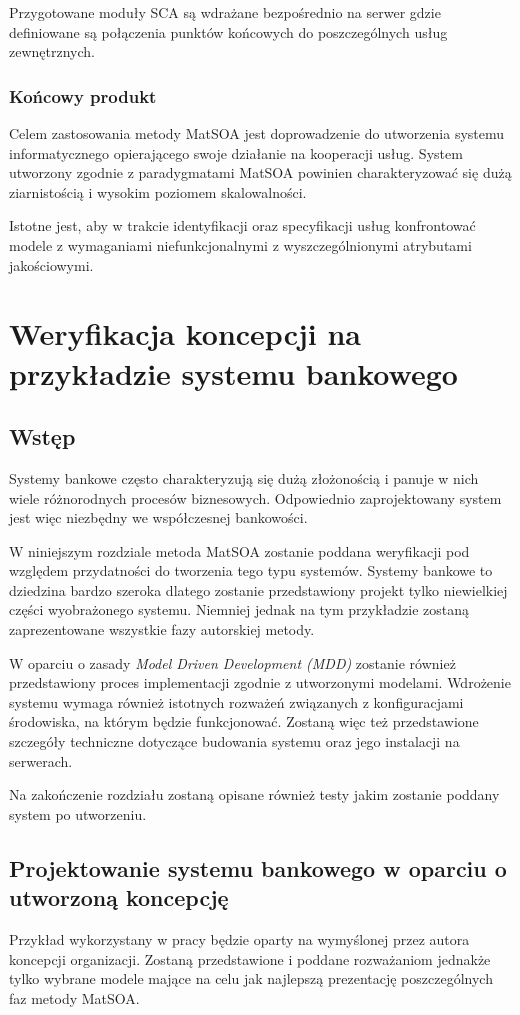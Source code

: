 Przygotowane moduły SCA są wdrażane bezpośrednio na serwer gdzie definiowane są połączenia punktów końcowych do poszczególnych usług zewnętrznych.

\subsection{Końcowy produkt}
Celem zastosowania metody MatSOA jest doprowadzenie do utworzenia systemu informatycznego opierającego swoje działanie na kooperacji usług. System utworzony zgodnie z paradygmatami MatSOA powinien charakteryzować się dużą ziarnistością i wysokim poziomem skalowalności.

Istotne jest, aby w trakcie identyfikacji oraz specyfikacji usług konfrontować modele z wymaganiami niefunkcjonalnymi z wyszczególnionymi atrybutami jakościowymi.

\chapter{Weryfikacja koncepcji na przykładzie systemu bankowego}
\section{Wstęp}
Systemy bankowe często charakteryzują się dużą złożonością i panuje w nich wiele różnorodnych procesów biznesowych. Odpowiednio zaprojektowany system jest więc niezbędny we współczesnej bankowości.
 
W niniejszym rozdziale metoda MatSOA zostanie poddana weryfikacji pod względem przydatności do tworzenia tego typu systemów. Systemy bankowe to dziedzina bardzo szeroka dlatego zostanie przedstawiony projekt tylko niewielkiej części wyobrażonego systemu. Niemniej jednak na tym przykładzie zostaną zaprezentowane wszystkie fazy autorskiej metody.

W oparciu o zasady \emph{Model Driven Development (MDD)} zostanie również przedstawiony proces implementacji zgodnie z utworzonymi modelami. Wdrożenie systemu wymaga również istotnych rozważeń związanych z konfiguracjami środowiska, na którym będzie funkcjonować. Zostaną więc też przedstawione szczegóły techniczne dotyczące budowania systemu oraz jego instalacji na serwerach.

Na zakończenie rozdziału zostaną opisane również testy jakim zostanie poddany system po utworzeniu.

\section{Projektowanie systemu bankowego w oparciu o utworzoną koncepcję}
Przykład wykorzystany w pracy będzie oparty na wymyślonej przez autora koncepcji organizacji. Zostaną przedstawione i poddane rozważaniom jednakże tylko wybrane modele mające na celu jak najlepszą prezentację poszczególnych faz metody MatSOA.

